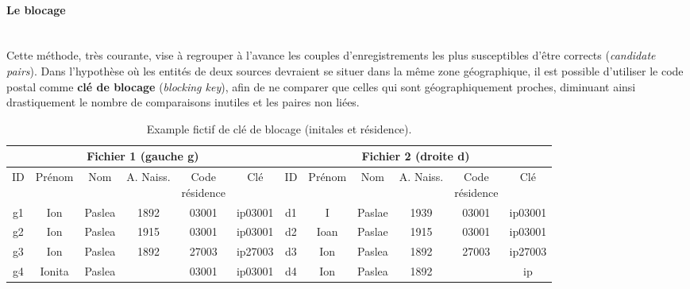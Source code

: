 \documentclass[a4paper,12pt,twoside]{book}
\begin{document}
			    \paragraph{Le blocage}\mbox{} \\
			    \label{blocking}
			    Cette méthode, très courante, vise à regrouper à l'avance les couples d'enregistrements les plus susceptibles d'être corrects (\textit{candidate pairs}). Dans l'hypothèse où les entités de deux sources devraient se situer dans la même zone géographique, il est possible d'utiliser le code postal comme \textbf{clé de blocage} (\textit{blocking key}), afin de ne comparer que celles qui sont géographiquement proches, diminuant ainsi drastiquement le nombre de comparaisons inutiles et les paires non liées.
			    
			    \begin{table}[htbp]
                \begin{adjustbox}{width=1\textwidth,center=\textwidth}
                \Large
                \renewcommand\cellalign{cl}
                \renewcommand\arraystretch{2}
			        \begin{tabular}{|*{12}{c|}}
			        \hline
			            \multicolumn{6}{|c|}{Fichier 1 (gauche g)}&\multicolumn{6}{c|}{Fichier 2 (droite d)}\\
			            \hline
                        ID & Prénom & Nom & A. Naiss. & 
                        \Centerstack{ Code \\ résidence}
                        & Clé & ID & Prénom & Nom & A. Naiss. & \Centerstack{ Code \\ résidence} & Clé\\
                        \hline 
                        g1 & Ion&Paslea&1892&03001&ip03001& d1& I&Paslae&1939&03001&ip03001\\
                        \hline
                        g2 & Ion&Paslea&1915&03001&ip03001& d2&Ioan&Paslae&1915&03001&ip03001\\ \hline
                        g3 & Ion & Paslea & 1892 & 27003 & ip27003 & d3& Ion & Paslea & 1892 & 27003 & ip27003\\ \hline
                        g4 & Ionita & Paslea & & 03001 & ip03001 & d4& Ion & Paslea & 1892 && ip\\ \hline
                    \end{tabular}
                    \end{adjustbox}
                \caption{Example fictif de clé de blocage (initales et résidence).}\label{tab2}
			    \end{table}
			    
\end{document}

